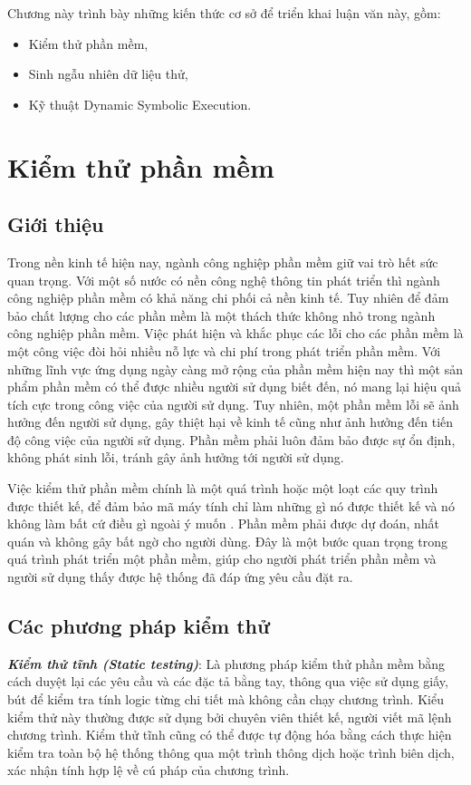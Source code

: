 Chương này trình bày những kiến thức cơ sở để triển khai luận văn này, gồm:
\begin{itemize}
\item Kiểm thử phần mềm,
\item Sinh ngẫu nhiên dữ liệu thử,
\item Kỹ thuật Dynamic Symbolic Execution.
\end{itemize}

\section{Kiểm thử phần mềm}


\subsection{Giới thiệu}
Trong nền kinh tế hiện nay, ngành công nghiệp phần mềm giữ vai trò hết sức quan trọng. Với một số nước có nền công nghệ thông tin phát triển thì ngành công nghiệp phần mềm có khả năng chi phối cả nền kinh tế. Tuy nhiên để đảm bảo chất lượng cho các phần mềm là một thách thức không nhỏ trong ngành công nghiệp phần mềm. Việc phát hiện và khắc phục các lỗi cho các phần mềm là một công việc đòi hỏi nhiều nỗ lực và chi phí trong phát triển phần mềm. Với những lĩnh vực ứng dụng ngày càng mở rộng của phần mềm hiện nay thì  một sản phẩm phần mềm có thể được nhiều người sử dụng biết đến, nó mang lại hiệu quả tích cực trong công việc của người sử dụng. Tuy nhiên, một phần mềm lỗi sẽ ảnh hưởng đến người sử dụng, gây thiệt hại về kinh tế cũng như ảnh hưởng đến tiến độ công việc của người sử dụng. Phần mềm phải luôn đảm bảo được sự ổn định, không phát sinh lỗi, tránh gây ảnh hưởng tới người sử dụng.

Việc kiểm thử phần mềm chính là một quá trình hoặc một loạt các quy trình được thiết kế, để đảm bảo mã máy tính chỉ làm những gì nó được thiết kế và nó không làm bất cứ điều gì ngoài ý muốn \cite{myers2011art}. Phần mềm phải được dự đoán, nhất quán và không gây bất ngờ cho người dùng. Đây là một bước quan trọng trong quá trình phát triển một phần mềm, giúp cho người phát triển phần mềm và người sử dụng thấy được hệ thống đã đáp ứng yêu cầu đặt ra.

\subsection{Các phương pháp kiểm thử}
\textbf{\textit{Kiểm thử tĩnh (Static testing)}}: Là phương pháp kiểm thử phần mềm bằng cách duyệt lại các yêu cầu và các đặc tả bằng tay, thông qua việc sử dụng giấy, bút để kiểm tra tính logic từng chi tiết mà không cần chạy chương trình. Kiểu kiểm thử này thường được sử dụng bởi chuyên viên thiết kế, người viết mã lệnh chương trình. Kiểm thử tĩnh cũng có thể được tự động hóa bằng cách thực hiện kiểm tra toàn bộ hệ thống thông qua một trình thông dịch hoặc trình biên dịch, xác nhận tính hợp lệ về cú pháp của chương trình.
		
